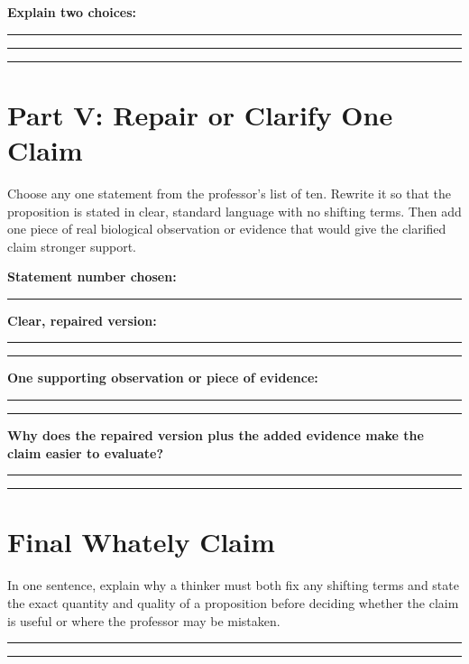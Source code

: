 \documentclass[12pt]{article}
\newcommand{\studentline}{\par\vspace{0.60em}\hrule\vspace{0.64em}}
\begin{document}
\textbf{Explain two choices:}\studentline\studentline\studentline

\Needspace{0.38\textheight}
\section*{Part V: Repair or Clarify One Claim}

Choose any one statement from the professor's list of ten. Rewrite it so that the proposition is stated in clear, standard language with no shifting terms. Then add one piece of real biological observation or evidence that would give the clarified claim stronger support.

\textbf{Statement number chosen:}\rule{0.8in}{0.4pt}

\textbf{Clear, repaired version:}\studentline\studentline

\textbf{One supporting observation or piece of evidence:}\studentline\studentline

\textbf{Why does the repaired version plus the added evidence make the claim easier to evaluate?}\studentline\studentline

\Needspace{0.28\textheight}
\section*{Final Whately Claim}

In one sentence, explain why a thinker must both fix any shifting terms and state the exact quantity and quality of a proposition before deciding whether the claim is useful or where the professor may be mistaken.

\studentline\studentline
\end{document}
